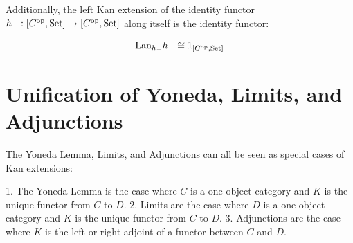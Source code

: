 \documentclass[10pt,a4paper]{article}
\begin{document}
Additionally, the left Kan extension of the identity functor $h_- : [C^{\textrm{op}}, {\textrm{Set}}] \to [C^{\textrm{op}}, {\textrm{Set}}]$ along itself is the identity functor:

\[\mathrm{Lan}_{h_-} h_- \cong 1_{[C^{\textrm{op}}, {\textrm{Set}}]}
\]

\section{Unification of Yoneda, Limits, and Adjunctions}

The Yoneda Lemma, Limits, and Adjunctions can all be seen as special cases of Kan extensions:

1. The Yoneda Lemma is the case where $C$ is a one-object category and $K$ is the unique functor from $C$ to $D$.
2. Limits are the case where $D$ is a one-object category and $K$ is the unique functor from $C$ to $D$.
3. Adjunctions are the case where $K$ is the left or right adjoint of a functor between $C$ and $D$.
\end{document}
